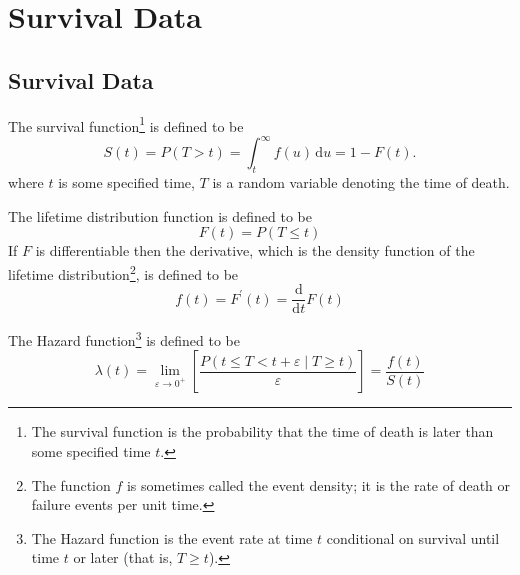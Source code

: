 \chapter{Survival Data}

\section{Survival Data}

\begin{definition}
    The survival function\footnote{The survival function is the probability that the time of death is later than some specified time $t$.} is defined to be
    \begin{equation}
        S(t)=P(T>t)=\int_{t}^{\infty}f(u)\,\mathrm{d}u=1-F(t) .
    \end{equation}
    where $t$ is some specified time, $T$ is a random variable denoting the time of death.
\end{definition}

\begin{definition}
    The lifetime distribution function is defined to be
    \begin{equation}
        F(t)=P(T\leq t)
    \end{equation}
    If $F$ is differentiable then the derivative, which is the density function of the lifetime distribution\footnote{The function $f$ is sometimes called the event density; it is the rate of death or failure events per unit time.}, is defined to be
    \begin{equation}
        f(t)=F^{\prime}(t)=\frac{\mathrm{d}}{\mathrm{d}t}F(t)
    \end{equation}
\end{definition}

\begin{definition}
    The Hazard function\footnote{The Hazard function is the event rate at time $t$ conditional on survival until time $t$ or later (that is, $T\geq t$).} is defined to be
    \begin{equation}
        \lambda(t)=\lim_{\varepsilon\rightarrow 0^{+}}\left[\frac{P(t\leq T<t+\varepsilon\mid T\geq t)}{\varepsilon}\right]=\frac{f(t)}{S(t)}
    \end{equation}
\end{definition}

